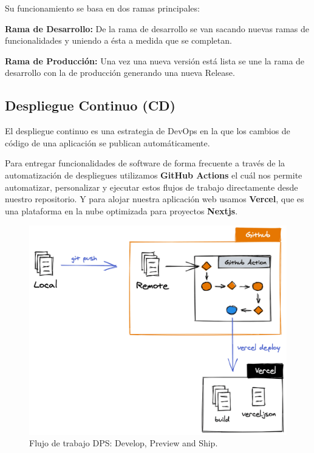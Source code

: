 \documentclass[12pt,twoside,titlepage]{report}
\begin{document}
Su funcionamiento se basa en dos ramas principales: 

\begin{compactitem}
    \item \textbf{Rama de Desarrollo:} De la rama de desarrollo se van sacando nuevas ramas de funcionalidades y uniendo a ésta a medida que se completan.
    \item \textbf{Rama de Producción:} Una vez una nueva versión está lista se une la rama de desarrollo con la de producción generando una nueva Release.
\end{compactitem}

\subsection{Despliegue Continuo (CD)}

El despliegue continuo es una estrategia de DevOps en la que los cambios de código de una aplicación se publican automáticamente.

Para entregar funcionalidades de software de forma frecuente a través de la automatización de despliegues utilizamos \textbf{GitHub Actions} el cuál nos permite automatizar, personalizar y ejecutar estos flujos de trabajo directamente desde nuestro repositorio. Y para alojar nuestra aplicación web usamos \textbf{Vercel}, que es una plataforma en la nube optimizada para proyectos \textbf{Nextjs}.

\begin{figure}[H]
    \centering
    \includegraphics[scale=0.3]{DevOps/DPS}
    \caption{Flujo de trabajo DPS: Develop, Preview and Ship.}
    \label{fig:vercel_workflow}
\end{figure}
\end{document}
